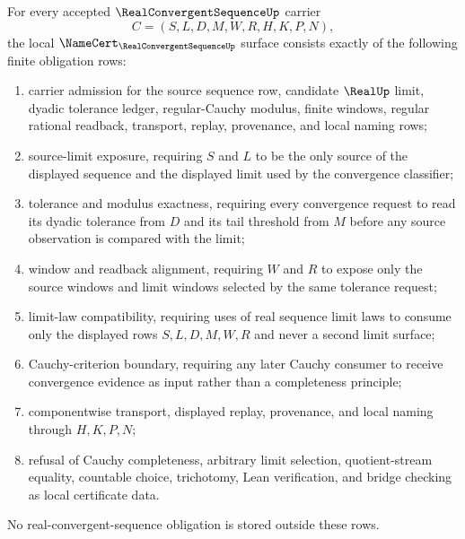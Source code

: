\begin{theorem}\label{thm:real-convergent-sequence-namecert-obligations}
For every accepted $\RealConvergentSequenceUp$ carrier
$$
C=(S,L,D,M,W,R,H,K,P,N),
$$
the local $\NameCert_{\RealConvergentSequenceUp}$ surface consists exactly of the following finite obligation rows:
\begin{enumerate}
\item carrier admission for the source sequence row, candidate $\RealUp$ limit, dyadic tolerance ledger, regular-Cauchy modulus, finite windows, regular rational readback, transport, replay, provenance, and local naming rows;
\item source-limit exposure, requiring $S$ and $L$ to be the only source of the displayed sequence and the displayed limit used by the convergence classifier;
\item tolerance and modulus exactness, requiring every convergence request to read its dyadic tolerance from $D$ and its tail threshold from $M$ before any source observation is compared with the limit;
\item window and readback alignment, requiring $W$ and $R$ to expose only the source windows and limit windows selected by the same tolerance request;
\item limit-law compatibility, requiring uses of real sequence limit laws to consume only the displayed rows $S,L,D,M,W,R$ and never a second limit surface;
\item Cauchy-criterion boundary, requiring any later Cauchy consumer to receive convergence evidence as input rather than a completeness principle;
\item componentwise transport, displayed replay, provenance, and local naming through $H,K,P,N$;
\item refusal of Cauchy completeness, arbitrary limit selection, quotient-stream equality, countable choice, trichotomy, Lean verification, and bridge checking as local certificate data.
\end{enumerate}
No real-convergent-sequence obligation is stored outside these rows.
\end{theorem}
